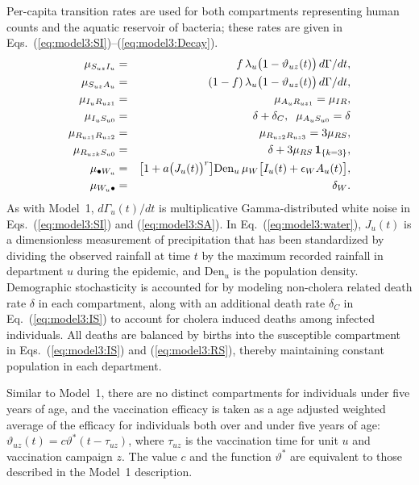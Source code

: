 \documentclass[10pt,letterpaper]{article}\usepackage[]{graphicx}\usepackage[table]{xcolor}
\newcommand\muIR{\mu_{IR}}
\newcommand\seasAmplitude{a}
\newcommand\muRS{\mu_{RS}}
\newcommand\vaccineEfficacy{\vartheta}
\newcommand\muDeath{\delta}
\newcommand\choleraDeath{\delta_{C}}
\newcommand\symptomFrac{f}
\newcommand\asymptomRelativeShed{\epsilon_{W}}
\newcommand\Wremoval{\delta_W}
\newcommand\Wshed{\mu_W}
\newcommand\vaccCounter{z}
\newcommand\demography{\bullet}
\newcommand\myeqref[1]{(\ref{#1})}
\begin{document}
Per-capita transition rates are used for both compartments representing human counts and the aquatic reservoir of bacteria; these rates  are given in Eqs.~\myeqref{eq:model3:SI}--\myeqref{eq:model3:Decay}.
\begin{eqnarray}
\label{eq:model3:SI}
\mu_{S_{u\vaccCounter}I_{u}} &=& \symptomFrac \,  \lambda_u \big(1-\vaccineEfficacy_{u\vaccCounter}(t)\big) \, d\Gamma/dt,
\\
\label{eq:model3:SA}
\mu_{S_{u\vaccCounter}A_{u}} &=& (1-\symptomFrac) \,  \lambda_u \big(1-\vaccineEfficacy_{u\vaccCounter}(t)\big) \,  d\Gamma/dt,
\\
\label{eq:model3:IR}
\mu_{I_{u}R_{u\vaccCounter 1}} &=& \mu_{A_{u}R_{u\vaccCounter 1}} = \muIR,
\\
\label{eq:model3:IS}
\mu_{I_{u}S_{u0}} &=& \muDeath + \choleraDeath, \hspace{2mm} \mu_{A_{u}S_{u0}} = \muDeath
\\
\label{eq:model3:RRnext}
\mu_{R_{u\vaccCounter 1}R_{u\vaccCounter 2}} &=& \mu_{R_{u\vaccCounter 2}R_{u\vaccCounter 3}} = 3\muRS,
\\
\label{eq:model3:RS}
\mu_{R_{u\vaccCounter k}S_{u0}} &=& \muDeath + 3\muRS \, \mathbf{1}_{\{k=3\}},
\\
\label{eq:model3:water}
\mu_{{\demography}W_u} &=& \big[1 + \seasAmplitude \big(J_u(t)\big)^r \big] \mathrm{Den}_u \, \Wshed \big[ I_{u}(t)+ \asymptomRelativeShed A_{u}(t) \big],
\\
\label{eq:model3:Decay}
\mu_{W_u\demography} &=& \Wremoval.
\end{eqnarray}
As with Model~1, $d\Gamma_u(t)/dt$ is multiplicative Gamma-distributed white noise in Eqs.~\myeqref{eq:model3:SI} and \myeqref{eq:model3:SA}.
In Eq.~\myeqref{eq:model3:water}, $J_u(t)$ is a dimensionless measurement of precipitation that has been standardized by dividing the observed rainfall at time $t$ by the maximum recorded rainfall in department $u$ during the epidemic, and $\mathrm{Den}_u$ is the population density.
Demographic stochasticity is accounted for by modeling non-cholera related death rate $\muDeath$ in each compartment, along with an additional death rate $\choleraDeath$ in Eq.~\myeqref{eq:model3:IS} to account for cholera induced deaths among infected individuals.
All deaths are balanced by births into the susceptible compartment in Eqs.~\myeqref{eq:model3:IS} and \myeqref{eq:model3:RS}, thereby maintaining constant population in each department.

Similar to Model~1, there are no distinct compartments for individuals under five years of age, and the vaccination efficacy is taken as a age adjusted weighted average of the efficacy for individuals both over and under five years of age:  $\vaccineEfficacy_{u \vaccCounter}(t) = c\vaccineEfficacy^*(t - \tau_{uz})$, where $\tau_{uz}$ is the vaccination time for unit $u$ and vaccination campaign $z$.
The value $c$ and the function $\vaccineEfficacy^*$ are equivalent to those described in the Model~1 description.
\end{document}
